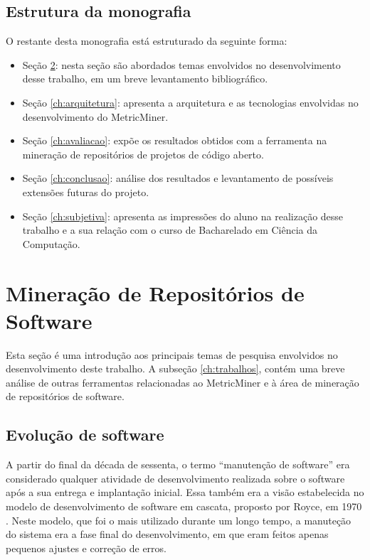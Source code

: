 \documentclass[a4paper, 12pt, twoside]{book}
\begin{document}
    \section{Estrutura da monografia}
        O restante desta monografia está estruturado da seguinte forma: 
        \begin{itemize}
            \item Seção \ref{ch:conceitos}: nesta seção são abordados temas 
                envolvidos no desenvolvimento desse trabalho, em um breve levantamento bibliográfico.
            \item Seção \ref{ch:arquitetura}: apresenta a arquitetura e as tecnologias
            envolvidas no desenvolvimento do MetricMiner.
            \item Seção \ref{ch:avaliacao}: expõe os resultados obtidos com a ferramenta 
                na mineração de repositórios de projetos de código aberto.
            \item Seção \ref{ch:conclusao}: análise dos resultados e levantamento 
                de possíveis extensões futuras do projeto.
            \item Seção \ref{ch:subjetiva}: apresenta as impressões do aluno na realização 
                desse trabalho e a sua relação com o curso de Bacharelado em Ciência da Computação.
        \end{itemize}
    
\chapter{Mineração de Repositórios de Software} \label{ch:conceitos}
    Esta seção é uma introdução aos principais temas de pesquisa envolvidos no desenvolvimento
    deste trabalho. A subseção \ref{ch:trabalhos}, contém uma breve análise de outras ferramentas
    relacionadas ao MetricMiner e à área de mineração de repositórios de software.

    \section{Evolução de software}
        A partir do final da década de sessenta, o termo ``manutenção de software'' era considerado qualquer 
        atividade de desenvolvimento realizada sobre o software após a sua entrega e implantação inicial.
        Essa também era a visão estabelecida no modelo de desenvolvimento de software em cascata, proposto 
        por Royce, em 1970 \cite{DBLP:series/springer/Mens08}. Neste modelo, que foi o mais 
        utilizado durante um longo tempo, a manuteção do sistema era a fase final do desenvolvimento, 
        em que eram feitos apenas pequenos ajustes e correção de erros.
        
\end{document}
